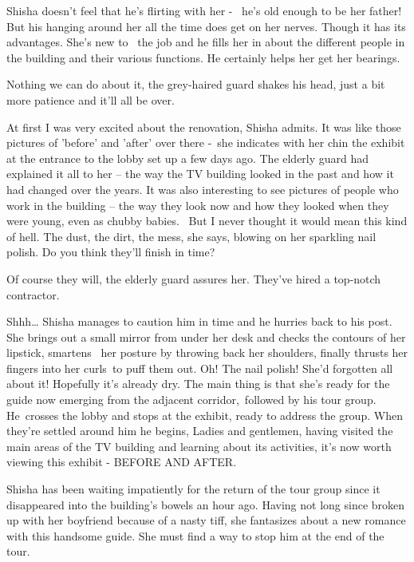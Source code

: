 \documentclass[letterpaper]{article}
\begin{document}
Shisha doesn't feel that he's flirting with her - \ he's old enough to be her father! But his hanging around her all the
time does get on her nerves. Though it has its advantages. She's new to\textcolor{red}{ }\ the job and he fills her in
about the different people in the building and their various functions. He certainly helps her get her bearings.

{\textquotedbl}Nothing we can do about it,{\textquotedbl} the grey-haired guard shakes his head, {\textquotedbl}just a
bit more patience and it'll all be over.{\textquotedbl} ~

{\textquotedbl}At first I was very excited about the renovation,{\textquotedbl} Shisha admits. {\textquotedbl}It was
like those pictures of 'before' and 'after' over there -{\textquotedbl}~she indicates with her chin the exhibit at the
entrance to the lobby set up a few days ago. The elderly guard had explained it all to her -- the way the TV building
looked in the past and how it had changed over the years. It was also interesting to see pictures of people who work in
the building -- the way they look now and how they looked when they were young, even as chubby babies.
~{\textquotedbl}But I never thought it would mean this kind of hell. The dust, the dirt, the mess,{\textquotedbl} she
says, blowing on her sparkling nail polish. {\textquotedbl}Do you think they'll finish in time?{\textquotedbl} 

{\textquotedbl}Of course they will,{\textquotedbl} the elderly guard assures her. {\textquotedbl}They've hired a
top-notch contractor.{\textquotedbl}

{\textquotedbl}Shhh{\dots}{\textquotedbl} Shisha manages to caution him in time and he hurries back to his post. She
brings out a small mirror from under her desk and checks the contours of her lipstick, smartens \textcolor{red}{\ }her
posture by\textcolor{red}{ }throwing back her shoulders, finally thrusts her fingers into her curls~to puff them out.
Oh! The nail polish! She'd forgotten all about it! Hopefully it's already dry. The main thing is that she's ready for
the guide now emerging from the adjacent corridor,~followed by his tour group. He~crosses the lobby and stops at the
exhibit, ready to address the group. When they're settled around him he begins, {\textquotedbl}Ladies and gentlemen,
having visited the main areas of the TV building and learning about its activities, it's now worth viewing this exhibit
- BEFORE AND AFTER.{\textquotedbl}

Shisha has been waiting impatiently for the return of the tour group since it disappeared into the building's bowels an
hour ago. Having not long since broken up with her boyfriend because of a nasty tiff, she fantasizes about a new
romance with this handsome guide. She must find a way to stop him at the end of the tour. 
\end{document}
